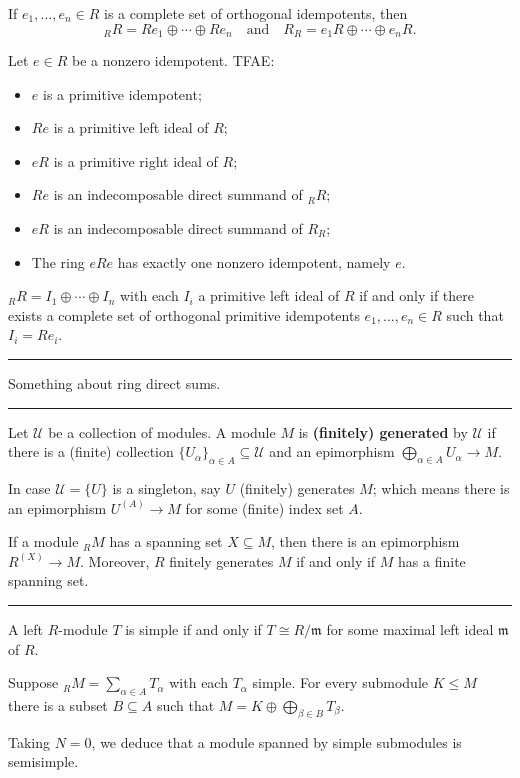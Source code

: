 \documentclass[12pt]{article}
\newcommand{\keyword}[1]{\textbf{#1}}
\newcommand{\sepline}{\rule{\textwidth}{0.4pt}}
\theoremstyle{definition}
\newcommand{\isp}[1]{\quad\text{#1}\quad}
\newcommand{\UU}{\mathcal{U}}
\newcommand{\mm}{\mathfrak{m}}
\newcommand{\<}{\left\langle}
\renewcommand{\>}{\right\rangle}
\newcommand{\iso}{\cong}
\newcommand{\seq}{\subseteq}
\renewcommand{\_}[1]{{_{#1}}}
\begin{document}
If $e_1, \dots, e_n \in R$ is a complete set of orthogonal idempotents, then
\[
    \_RR = Re_1 \oplus \cdots \oplus Re_n
    \isp{and}
    R_R = e_1R \oplus \cdots \oplus e_nR.
\]

Let $e \in R$ be a nonzero idempotent. TFAE:
\begin{itemize}[nosep]
    \item $e$ is a primitive idempotent;
    \item $Re$ is a primitive left ideal of $R$;
    \item $eR$ is a primitive right ideal of $R$;
    \item $Re$ is an indecomposable direct summand of $\_RR$;
    \item $eR$ is an indecomposable direct summand of $R_R$;
    \item The ring $eRe$ has exactly one nonzero idempotent, namely $e$.
\end{itemize}

$\_RR = I_1 \oplus \cdots \oplus I_n$ with each $I_i$ a primitive left ideal of $R$ if and only if there exists a complete set of orthogonal primitive idempotents $e_1, \dots, e_n \in R$ such that $I_i = Re_i$.

\sepline

Something about ring direct sums.

\sepline


Let $\UU$ be a collection of modules.
A module $M$ is \keyword{(finitely) generated} by $\UU$ if there is a (finite) collection $\{U_\alpha\}_{\alpha \in A} \seq \UU$ and an epimorphism $\bigoplus_{\alpha \in A} U_\alpha \to M$.

In case $\UU = \{U\}$ is a singleton, say $U$ (finitely) generates $M$; which means there is an epimorphism $U^{(A)} \to M$ for some (finite) index set $A$.

If a module $\_RM$ has a spanning set $X \seq M$, then there is an epimorphism $R^{(X)} \to M$.
Moreover, $R$ finitely generates $M$ if and only if $M$ has a finite spanning set.

\sepline

A left $R$-module $T$ is simple if and only if $T \iso R/\mm$ for some maximal left ideal $\mm$ of $R$.


Suppose $\_RM = \sum_{\alpha \in A} T_\alpha$ with each $T_\alpha$ simple.
For every submodule $K \leq M$ there is a subset $B \seq A$ such that $M = K \oplus \bigoplus_{\beta \in B} T_\beta$.

Taking $N = 0$, we deduce that a module spanned by simple submodules is semisimple.
\end{document}
